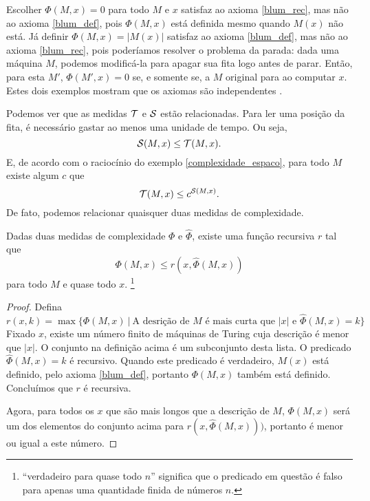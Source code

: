 \begin{example}
    Escolher $\Phi(M, x) = 0$ para todo $M$ e $x$
    satisfaz ao axioma \ref{blum_rec},
    mas não ao axioma \ref{blum_def},
    pois $\Phi(M, x)$ está definida mesmo quando $M(x)$ não está.
    Já definir $\Phi(M, x) = |M(x)|$
    satisfaz ao axioma \ref{blum_def},
    mas não ao axioma \ref{blum_rec},
    pois poderíamos resolver o problema da parada:
    dada uma máquina $M$, podemos modificá-la
    para apagar sua fita logo antes de parar.
    Então, para esta $M'$,
    $\Phi(M', x) = 0$ se, e somente se,
    a $M$ original para ao computar $x$.
    Estes dois exemplos mostram que os axiomas são independentes
    \cite[p. 3]{Blum1967}.
\end{example}

Podemos ver que as medidas ${\mathcal{T}}$ e ${\mathcal{S}}$ estão relacionadas.
Para ler uma posição da fita,
é necessário gastar ao menos uma unidade de tempo.
Ou seja,
\begin{equation*}
    {\mathcal{S}}(M, x) \leq {\mathcal{T}}(M, x).
\end{equation*}
E, de acordo com o raciocínio do exemplo \ref{complexidade_espaco},
para todo $M$ existe algum $c$ que
\begin{equation*}
    {\mathcal{T}}(M, x) \leq c^{{\mathcal{S}}(M, x)}.
\end{equation*}
De fato, podemos relacionar quaisquer duas medidas de complexidade.

\begin{theorem}
    \label{relacao_medidas}
    Dadas duas medidas de complexidade $\Phi$ e $\hat \Phi$,
    existe uma função recursiva $r$ tal que
    \begin{equation*}
        \Phi(M, x) \leq r( x, \hat \Phi(M, x))
    \end{equation*}
    para todo $M$ e quase todo $x$.
    \footnote{
        ``verdadeiro para quase todo $n$''
        significa que o predicado em questão
        é falso para apenas uma quantidade finida de números $n$.
    }
\end{theorem}

\begin{proof}
    Defina
    \begin{equation*}
        r( x, k ) = \max \{ \Phi(M, x) \ | \
            \text{A desrição de $M$ é mais curta que $|x|$}
            \text{ e }
            \hat \Phi(M, x) = k
        \}
    \end{equation*}
    Fixado $x$, existe um número finito de máquinas de Turing
    cuja descrição é menor que $|x|$.
    O conjunto na definição acima é um subconjunto desta lista.
    O predicado $\hat \Phi(M, x) = k$ é recursivo.
    Quando este predicado é verdadeiro,
    $M(x)$ está definido, pelo axioma \ref{blum_def},
    portanto $\Phi(M, x)$ também está definido.
    Concluímos que $r$ é recursiva.

    Agora, para todos os $x$ que são mais longos que a descrição de $M$,
    $\Phi(M, x)$ será um dos elementos do conjunto acima
    para $r( x, \hat \Phi(M, x)))$,
    portanto é menor ou igual a este número.
\end{proof}

